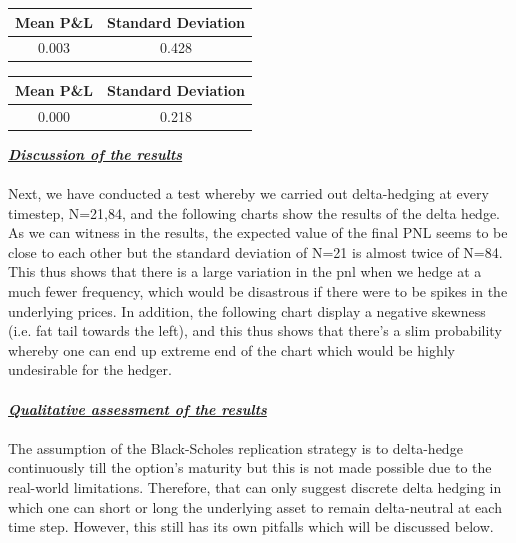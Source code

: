 \documentclass{article}
\begin{document}
\begin{center}
\begin{tabular}{|c|c|}
	\hline
	\textbf{Mean P\&L}& \textbf{Standard Deviation}\\
	\hline
	0.003 & 0.428
	\\
	\hline
\end{tabular}
\qquad\qquad\qquad
\begin{tabular}{|c|c|}
	\hline
	\textbf{Mean P\&L}& \textbf{Standard Deviation}\\
	\hline
	0.000 & 0.218
	\\
	\hline
\end{tabular}
\end{center}

\newpage

\noindent\textbf{\textit{\underline{Discussion of the results }}}\\ \\

\noindent Next, we have conducted a test whereby we carried out delta-hedging at every timestep, N=21,84, and the following charts show the results of the delta hedge. As we can witness in the results, the expected value of the final PNL seems to be close to each other but the standard deviation of N=21 is almost twice of N=84. This thus shows that there is a large variation in the pnl when we hedge at a much fewer frequency, which would be disastrous if there were to be spikes in the underlying prices. In addition, the following chart display a negative skewness (i.e. fat tail towards the left), and this thus shows that there’s a slim probability whereby one can end up extreme end of the chart which would be highly undesirable for the hedger. \\ \\


\noindent \textbf{\textit{\underline{Qualitative assessment of the results}}} \\ \\

\noindent The assumption of the Black-Scholes replication strategy is to delta-hedge continuously till the option’s maturity but this is not made possible due to the real-world limitations. Therefore, that can only suggest discrete delta hedging in which one can short or long the underlying asset to remain delta-neutral at each time step. However, this still has its own pitfalls which will be discussed below. \\ \\
\end{document}
